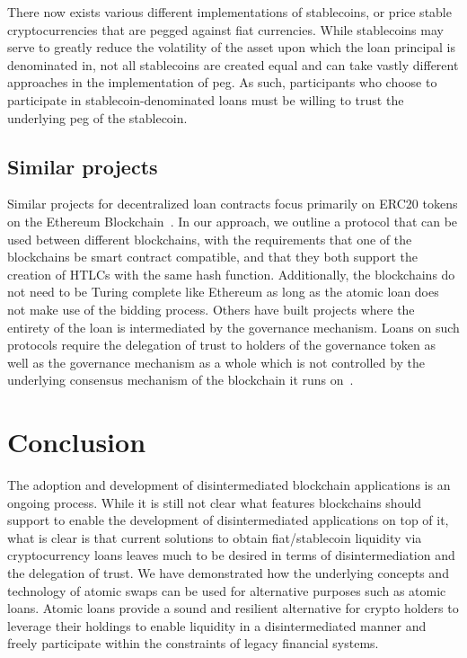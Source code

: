 \documentclass{llncs}
\begin{document}
There now exists various different implementations of stablecoins, or price stable cryptocurrencies that are pegged against fiat currencies. While stablecoins may serve to greatly reduce the volatility of the asset upon which the loan principal is denominated in, not all stablecoins are created equal and can take vastly different approaches in the implementation of peg. As such, participants who choose to participate in stablecoin-denominated loans must be willing to trust the underlying peg of the stablecoin.

\subsection{Similar projects}
Similar projects for decentralized loan contracts focus primarily on ERC20 tokens on the Ethereum Blockchain~\cite{ref_article13}. In our approach, we outline a protocol that can be used between different blockchains, with the requirements that one of the blockchains be smart contract compatible, and that they both support the creation of HTLCs with the same hash function. Additionally, the blockchains do not need to be Turing complete like Ethereum as long as the atomic loan does not make use of the bidding process. Others have built projects where the entirety of the loan is intermediated by the governance mechanism. Loans on such protocols require the delegation of trust to holders of the governance token as well as the governance mechanism as a whole which is not controlled by the underlying consensus mechanism of the blockchain it runs on~\cite{ref_article7}. 

\section{Conclusion}
The adoption and development of disintermediated blockchain applications is an ongoing process. While it is still not clear what features blockchains should support to enable the development of disintermediated applications on top of it, what is clear is that current solutions to obtain fiat/stablecoin liquidity via cryptocurrency loans leaves much to be desired in terms of disintermediation and the delegation of trust. We have demonstrated how the underlying concepts and technology of atomic swaps can be used for alternative purposes such as atomic loans. Atomic loans provide a sound and resilient alternative for crypto holders to leverage their holdings to enable liquidity in a disintermediated manner and freely participate within the constraints of legacy financial systems.
\end{document}
